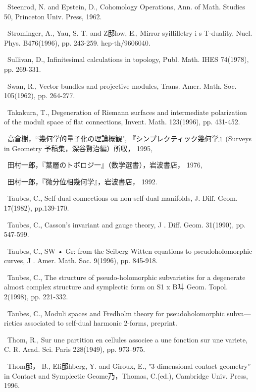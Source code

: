 {\noindent [349]\ Steenrod, N. and Epstein, D., Cohomology Operations, Ann. of Math. Studies 50, Princeton Univ. Press, 1962.\par\smallskip
\noindent [350]\ Strominger, A., Yau, S. T. and Z邸low, E., Mirror syillilletry i s T-duality, Nucl. Phys. B476(1996), pp. 243-259. hep-th/9606040.\par\smallskip
\noindent [351]\ Sullivan, D., Infinitesimal calculations in topology, Publ. Math. IHES 74(1978), pp. 269-331.\par\smallskip
\noindent [352]\ Swan, R., Vector bundles and projective modules, Trans. Amer. Math. Soc. 105(1962), pp. 264-277.\par\smallskip
\noindent [353]\ Takakura, T., Degeneration of Riemann surfaces and intermediate polarization of the moduli space of flat connections, Invent. Math. 123(1996), pp. 431-452.\par\smallskip
\noindent [354]\ 高倉樹，‘‘幾何学的量子化の理論概観", 『シンプレクティック幾何学』(Surveys in Geometry 予稿集，深谷賢治編）所収， 1995,\par\smallskip
\noindent [355]\ 田村一郎，『葉層のトボロジ一』（数学選書），岩波書店， 1976,\par\smallskip
\noindent [356]\ 田村一郎，『微分位相幾何学』，岩波書店， 1992.\par\smallskip
\noindent [357]\ Taubes, C., Self-dual connections on non-self-dual manifolds, J. Diff. Geom. 17(1982), pp.139-170.\par\smallskip
\noindent [358]\ Taubes, C., Casson's invariant and gauge theory, J . Diff. Geom. 31(1990), pp. 547-599.\par\smallskip
\noindent [359]\ Taubes, C., SW • Gr: from the Seiberg-Witten equations to pseudoholomorphic curves, J . Amer. Math. Soc. 9(1996), pp. 845-918.\par\smallskip
\noindent [360]\ Taubes, C., The structure of pseudo-holomorphic subvarieties for a degenerate almost complex structure and symplectic form on S1 x B叫 Geom. Topol. 2(1998), pp. 221-332.\par\smallskip
\noindent [361]\ Taubes, C., Moduli spaces and Fredholm theory for pseudoholomorphic subva— rieties associated to self-dual harmonic 2-forms, preprint.\par\smallskip
\noindent [362]\ Thom, R., Sur une partition en cellules associee a une fonction sur une variete, C. R. Acad. Sci. Paris 228(1949), pp. 973--975.\par\smallskip
\noindent [363]\ Thom邸， B., Eli邸hberg, Y. and Giroux, E., "3-dimensional contact geometry'' in Contact and Symplectic Geome乃，Thomas, C.(ed.), Cambridge Univ. Press, 1996.\par\smallskip
}
